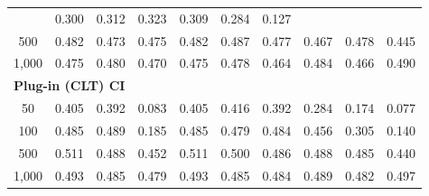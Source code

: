 \documentclass{article}
\numberwithin{equation}{section}
\begin{document}
\begin{table}[ht]
\begin{tabular}{c|ccc|cccccc}
& 0.300 & \cellcolor{covheat!6!white}0.312 & \cellcolor{covheat!12!white}0.323 & \cellcolor{covheat!5!white}0.309 & 0.284 & 0.127 \\
500
& \cellcolor{covheat!91!white}0.482 & \cellcolor{covheat!86!white}0.473 & \cellcolor{covheat!87!white}0.475
& \cellcolor{covheat!91!white}0.482 & \cellcolor{covheat!94!white}0.487 & \cellcolor{covheat!88!white}0.477 & \cellcolor{covheat!84!white}0.467 & \cellcolor{covheat!89!white}0.478 & \cellcolor{covheat!73!white}0.445 \\
1{,}000
& \cellcolor{covheat!87!white}0.475 & \cellcolor{covheat!90!white}0.480 & \cellcolor{covheat!85!white}0.470
& \cellcolor{covheat!87!white}0.475 & \cellcolor{covheat!89!white}0.478 & \cellcolor{covheat!82!white}0.464 & \cellcolor{covheat!92!white}0.484 & \cellcolor{covheat!83!white}0.466 & \cellcolor{covheat!95!white}0.490 \\
\hline
\multicolumn{10}{l}{\textbf{Plug-in (CLT) CI}} \\ \hline
50
& \cellcolor{covheat!53!white}0.405 & \cellcolor{covheat!46!white}0.392 & 0.083
& \cellcolor{covheat!53!white}0.405 & \cellcolor{covheat!58!white}0.416 & \cellcolor{covheat!46!white}0.392 & 0.284 & 0.174 & 0.077 \\
100
& \cellcolor{covheat!92!white}0.485 & \cellcolor{covheat!94!white}0.489 & 0.185
& \cellcolor{covheat!92!white}0.485 & \cellcolor{covheat!89!white}0.479 & \cellcolor{covheat!92!white}0.484 & \cellcolor{covheat!78!white}0.456 & \cellcolor{covheat!3!white}0.305 & 0.140 \\
500
& \cellcolor{covheat!100!white}0.511 & \cellcolor{covheat!94!white}0.488 & \cellcolor{covheat!76!white}0.452
& \cellcolor{covheat!100!white}0.511 & \cellcolor{covheat!100!white}0.500 & \cellcolor{covheat!93!white}0.486 & \cellcolor{covheat!94!white}0.488 & \cellcolor{covheat!92!white}0.485 & \cellcolor{covheat!70!white}0.440 \\
1{,}000
& \cellcolor{covheat!96!white}0.493 & \cellcolor{covheat!92!white}0.485 & \cellcolor{covheat!89!white}0.479
& \cellcolor{covheat!96!white}0.493 & \cellcolor{covheat!92!white}0.485 & \cellcolor{covheat!92!white}0.484 & \cellcolor{covheat!94!white}0.489 & \cellcolor{covheat!91!white}0.482 & \cellcolor{covheat!98!white}0.497 \\
\hline
\end{tabular}
\end{table}
\end{document}
